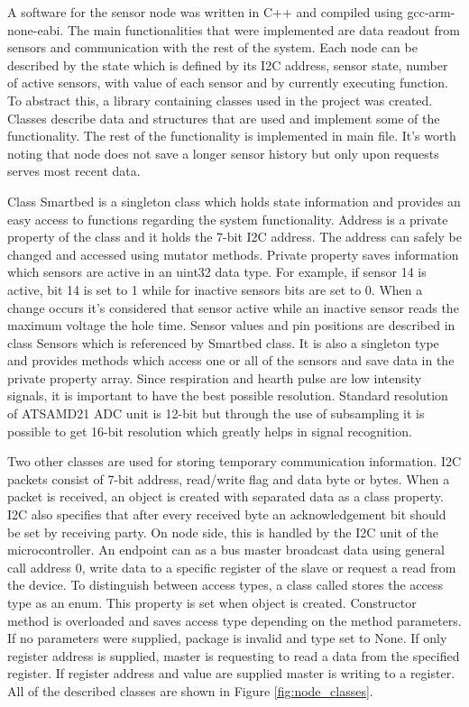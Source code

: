 A software for the sensor node was written in C++ and compiled using gcc-arm-none-eabi. The main functionalities that were implemented are data readout from sensors and communication with the rest of the system. Each node can be described by the state which is defined by its \ac{I2C} address, sensor state, number of active sensors, with value of each sensor and by currently executing function. To abstract this, a library containing classes used in the project was created. Classes describe data and structures that are used and implement some of the functionality. The rest of the functionality is implemented in main file. It's worth noting that node does not save a longer sensor history but only upon requests serves most recent data.

Class Smartbed is a singleton class which holds state information and provides an easy access to functions regarding the system functionality. Address is a private property of the class and it holds the 7-bit \ac{I2C} address. The address can safely be changed and accessed using mutator methods. Private property  saves information which sensors are active in an uint32 data type. For example, if sensor 14 is active, bit 14 is set to 1 while for inactive sensors bits are set to 0. When a change occurs it's considered that sensor active while an inactive sensor reads the maximum voltage the hole time. Sensor values and pin positions are described in class Sensors which is referenced by Smartbed class. It is also a singleton type and provides methods which access one or all of the sensors and save data in the private property array. Since respiration and hearth pulse are low intensity signals, it is important to have the best possible resolution. Standard resolution of ATSAMD21 \ac{ADC} unit is 12-bit but through the use of subsampling it is possible to get 16-bit resolution which greatly helps in signal recognition.

Two other classes are used for storing temporary communication information. \ac{I2C} packets consist of 7-bit address, read/write flag and data byte or bytes. When a packet is received, an object is created with separated data as a class property. \ac{I2C} also specifies that after every received byte an acknowledgement bit should be set by receiving party. On node side, this is handled by the \ac{I2C} unit of the microcontroller. An endpoint can as a bus master broadcast data using general call address 0, write data to a specific register of the slave or request a read from the device\cite{understanding_i2c}. To distinguish between access types, a class called  stores the access type as an enum. This property is set when object is created. Constructor method is overloaded and saves access type depending on the method parameters. If no parameters were supplied, package is invalid and type set to None. If only register address is supplied, master is requesting to read a data from the specified register. If register address and value are supplied master is writing to a register. All of the described classes are shown in Figure \ref{fig:node_classes}.

